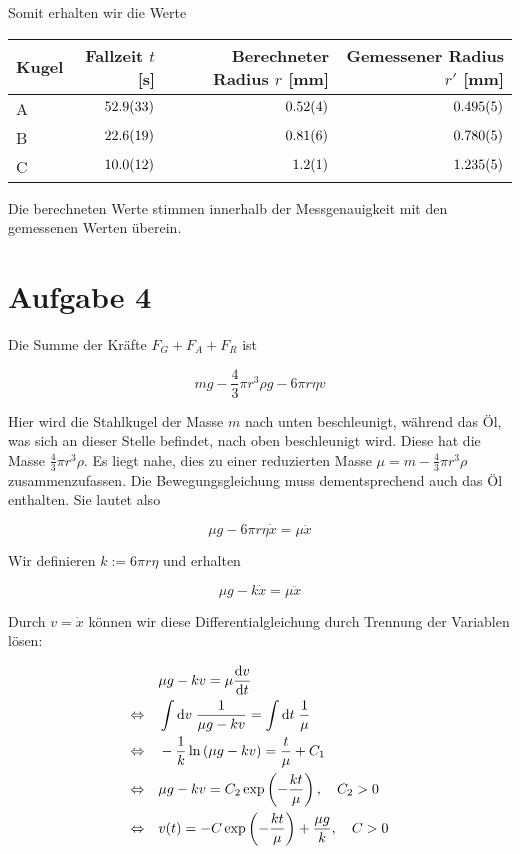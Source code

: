 \documentclass[a4paper,german,12pt,smallheadings]{scrartcl}
\begin{document}
Somit erhalten wir die Werte

\vspace{0.5cm}
\begin{tabular}{l|r|r|r}
  Kugel & Fallzeit $t$ [s] & Berechneter Radius $r$ [mm] & Gemessener Radius $r'$ [mm] \\
  \hline
  A & $\num{52.9+-3.3}$ & $\num{0.52+-0.04}$ & $\num{0.495+-0.005}$ \\
  B & $\num{22.6+-1.9}$ & $\num{0.81+-0.06}$ & $\num{0.780+-0.005}$ \\
  C & $\num{10.0+-1.2}$ & $\num{1.2+-0.1}$ & $\num{1.235+-0.005}$ \\
\end{tabular}
\vspace{0.5cm}

Die berechneten Werte stimmen innerhalb der Messgenauigkeit mit den
gemessenen Werten überein.

\section*{Aufgabe 4}

Die Summe der Kräfte  $F_G + F_A + F_R$ ist

\begin{equation}
  mg - \frac{4}{3} \pi r^3 \rho g - 6 \pi r \eta v
\end{equation}

Hier wird die Stahlkugel der Masse $m$ nach unten beschleunigt, während das Öl,
was sich an dieser Stelle befindet, nach oben beschleunigt wird. Diese hat die
Masse $\frac{4}{3} \pi r^3 \rho$. Es liegt nahe, dies zu einer reduzierten
Masse $\mu = m - \frac{4}{3} \pi r^3 \rho$ zusammenzufassen. Die
Bewegungsgleichung muss dementsprechend auch das Öl enthalten. Sie lautet also

\begin{equation}
  \mu g - 6 \pi r \eta \dot{x} = \mu \ddot{x}
\end{equation}

Wir definieren $k := 6 \pi r \eta$ und erhalten

\begin{equation}
  \mu g - k \dot{x} = \mu \ddot{x}
\end{equation}

Durch $v = \dot{x}$ können wir diese Differentialgleichung durch Trennung der
Variablen lösen:

\begin{align*}
  &\mu g - k v = \mu \frac{\dif v}{\dif t} \\
  \Leftrightarrow \quad &
  \int \dif v \; \frac{1}{\mu g - kv} = \int \dif t \; \frac{1}{\mu} \\
  \Leftrightarrow \quad &
  -\frac{1}{k} \ln \del{\mu g - kv} = \frac{t}{\mu} + C_1 \\
  \Leftrightarrow \quad &
  \mu g - kv = C_2 \exp \del{- \frac{kt}{\mu} }, \quad C_2 > 0 \\
  \Leftrightarrow \quad &
  v(t) = -C \exp \del{- \frac{kt}{\mu} } + \frac{\mu g}{k}, \quad C > 0
\end{align*}
\end{document}
